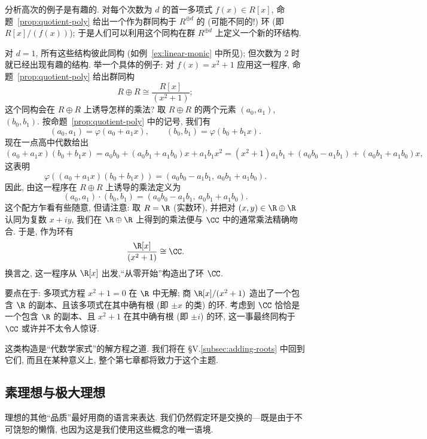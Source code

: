 \begin{example}
\label{ex:C-from-R}
分析高次的例子是有趣的. 对每个次数为 $d$ 的首一多项式 $f(x) \in R[x]$, 命题~\ref{prop:quotient-poly} 给出一个作为群同构于 $R^{\oplus d}$ 的 (可能不同的!) 环 (即 $R[x]/(f(x))$); 于是人们可以利用这个同构在群 $R^{\oplus d}$ 上定义一个新的环结构.

对 $d = 1$, 所有这些结构彼此同构 (如例~\ref{ex:linear-monic} 中所见); 但次数为 $2$ 时就已经出现有趣的结构. 举一个具体的例子: 对 $f(x) = x^2 + 1$ 应用这一程序, 命题~\ref{prop:quotient-poly} 给出群同构
\[
R \oplus R \cong \frac{R[x]}{(x^2 + 1)};
\]
这个同构会在 $R \oplus R$ 上诱导怎样的乘法? 取 $R \oplus R$ 的两个元素 $(a_0, a_1)$, $(b_0, b_1)$. 按命题~\ref{prop:quotient-poly} 中的记号, 我们有
\[
(a_0, a_1) = \varphi(a_0 + a_1 x), \qquad (b_0, b_1) = \varphi(b_0 + b_1 x).
\]
现在一点高中代数给出
\[
(a_0 + a_1 x)(b_0 + b_1 x) = a_0 b_0 + (a_0 b_1 + a_1 b_0)x + a_1 b_1 x^2 = (x^2 + 1)a_1 b_1 + (a_0 b_0 - a_1 b_1) + (a_0 b_1 + a_1 b_0)x,
\]
这表明
\[
\varphi((a_0 + a_1 x)(b_0 + b_1 x)) = (a_0 b_0 - a_1 b_1,\ a_0 b_1 + a_1 b_0).
\]
因此, 由这一程序在 $R \oplus R$ 上诱导的乘法定义为
\[
(a_0, a_1) \cdot (b_0, b_1) = (a_0 b_0 - a_1 b_1,\ a_0 b_1 + a_1 b_0).
\]
这个配方乍看有些随意, 但请注意: 取 $R = \R$ (实数环), 并把对 $(x, y) \in \R \oplus \R$ 认同为复数 $x + iy$, 我们在 $\R \oplus \R$ 上得到的乘法便与 $\CC$ 中的通常乘法精确吻合. 于是, 作为环有
\[
\frac{\R[x]}{(x^2 + 1)} \cong \CC.
\]
换言之, 这一程序从 $\R[x]$ 出发,``从零开始''构造出了环 $\CC$.

要点在于: 多项式方程 $x^2 + 1 = 0$ 在 $\R$ 中无解; 商 $\R[x]/(x^2 + 1)$ 造出了一个包含 $\R$ 的副本、且该多项式在其中确有根 (即 $\pm x$ 的类) 的环. 考虑到 $\CC$ 恰恰是一个包含 $\R$ 的副本、且 $x^2 + 1$ 在其中确有根 (即 $\pm i$) 的环, 这一事最终同构于 $\CC$ 或许并不太令人惊讶.

这类构造是``代数学家式''的解方程之道. 我们将在 \S V.\ref{subsec:adding-roots} 中回到它们, 而且在某种意义上, 整个第七章都将致力于这个主题.
\end{example}

\subsection{素理想与极大理想}
\label{subsec:prime-maximal-def}

理想的其他``品质''最好用商的语言来表达. 我们仍然假定环是交换的---既是由于不可饶恕的懒惰, 也因为这是我们使用这些概念的唯一语境.

